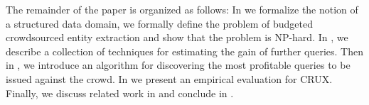 The remainder of the paper is organized as follows: In  we formalize the notion of a structured data domain, we formally define the problem of budgeted crowdsourced entity extraction and show that the problem is NP-hard. In , we describe a collection of techniques for estimating the gain of further queries. Then in , we introduce an algorithm for discovering the most profitable queries to be issued against the crowd. In  we present an empirical evaluation for CRUX. Finally, we discuss related work in  and conclude in .
%
%
